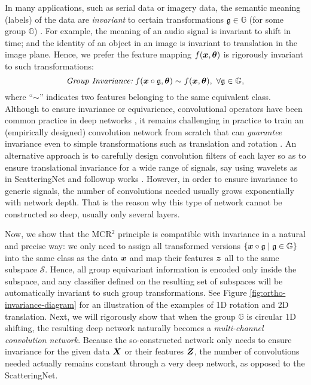 \documentclass[\toplevelprefix/book-main.tex]{subfiles}
\begin{document}
In many applications, such as serial data or imagery data, the semantic meaning (labels) of the data are  {\em invariant} to certain transformations $\mathfrak{g} \in \mathbb{G}$ (for some group $\mathbb{G}$) \cite{CohenW16,deep-sets-NIPS2017}. For example, the meaning of an audio signal is invariant to shift in time; and the identity of an object in an image is invariant to translation in the image plane. Hence, we prefer the feature mapping $f(\bm{x},\bm \theta)$ is rigorously invariant to such transformations:
\begin{equation}
\mbox{\em Group Invariance:}\;   f(\bm{x}\circ \mathfrak{g}, \bm \theta) \sim f(\bm{x},\bm \theta),\ \forall \mathfrak{g} \in \mathbb{G},
\end{equation}
where ``$\sim$'' indicates two features belonging to the same equivalent class. Although to ensure invariance or equivarience, convolutional operators have been common practice in deep networks \cite{CohenW16}, it remains challenging in practice to train an (empirically designed) convolution network from scratch that can {\em guarantee} invariance even to simple transformations such as translation and rotation \cite{azulay2018deep,engstrom2017rotation}. An alternative approach is to carefully design convolution filters of each layer so as to ensure translational invariance for a wide range of signals, say using wavelets as in ScatteringNet \cite{scattering-net} and followup works \cite{Wiatowski-2018}. However, in order to ensure invariance to generic signals, the number of convolutions needed usually grows exponentially with network depth. That is the reason why this type of network cannot be constructed so deep, usually only several layers. 

Now, we show that the MCR$^2$ principle is compatible with invariance in a natural and precise way: we only need to assign all transformed versions $\{\bm{x}\circ \mathfrak{g} \mid \mathfrak{g} \in \mathbb G\}$  into the same class as the data $\bm{x}$ and map their features $\bm{z}$ all to the same subspace $\mathcal S$. Hence, all group equivariant information is encoded only inside the subspace, and any classifier defined on the resulting set of subspaces will be automatically invariant to such group transformations. See Figure \ref{fig:ortho-invariance-diagram} for an illustration of the examples of 1D rotation and 2D translation.  Next, we will rigorously show that when the group $\mathbb G$ is circular 1D shifting, the resulting deep network naturally becomes a {\em multi-channel convolution network}. 
Because the so-constructed network only needs to ensure invariance for the given data $\bm{X}$ or their features $\bm{Z}$, the number of convolutions needed actually remains constant through a very deep network, as opposed to the ScatteringNet. 
\end{document}
